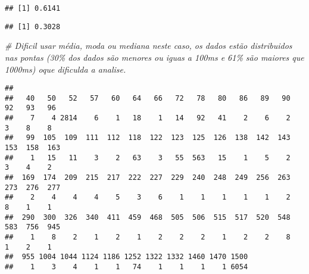 \documentclass[
]{article}
\newenvironment{Shaded}{\begin{snugshade}}{\end{snugshade}}
\newcommand{\AttributeTok}[1]{\textcolor[rgb]{0.13,0.29,0.53}{#1}}
\newcommand{\CommentTok}[1]{\textcolor[rgb]{0.56,0.35,0.01}{\textit{#1}}}
\newcommand{\DecValTok}[1]{\textcolor[rgb]{0.00,0.00,0.81}{#1}}
\newcommand{\FunctionTok}[1]{\textcolor[rgb]{0.13,0.29,0.53}{\textbf{#1}}}
\newcommand{\NormalTok}[1]{#1}
\newcommand{\SpecialCharTok}[1]{\textcolor[rgb]{0.81,0.36,0.00}{\textbf{#1}}}
\begin{document}
\begin{verbatim}
## [1] 0.6141
\end{verbatim}

\begin{Shaded}
\end{Shaded}

\begin{verbatim}
## [1] 0.3028
\end{verbatim}

\begin{Shaded}
\begin{Highlighting}[]
\CommentTok{\# Dificil usar média, moda ou mediana neste caso, os dados estão distribuidos nas pontas (30\% dos dados são menores ou iguas a 100ms e 61\% são maiores que 1000ms) oque dificulda a analise.}
\end{Highlighting}
\end{Shaded}

\begin{Shaded}
\end{Shaded}

\begin{verbatim}
## 
##   40   50   52   57   60   64   66   72   78   80   86   89   90   92   93   96 
##    7    4 2814    6    1   18    1   14   92   41    2    6    2    3    8    8 
##   99  105  109  111  112  118  122  123  125  126  138  142  143  153  158  163 
##    1   15   11    3    2   63    3   55  563   15    1    5    2    3    4    2 
##  169  174  209  215  217  222  227  229  240  248  249  256  263  273  276  277 
##    2    4    4    4    5    3    6    1    1    1    1    1    2    8    1    1 
##  290  300  326  340  411  459  468  505  506  515  517  520  548  583  756  945 
##    1    8    2    1    2    1    2    2    2    1    2    2    8    1    2    1 
##  955 1004 1044 1124 1186 1252 1322 1332 1460 1470 1500 
##    1    3    4    1    1   74    1    1    1    1 6054
\end{verbatim}

\begin{Shaded}
\end{Shaded}
\end{document}
